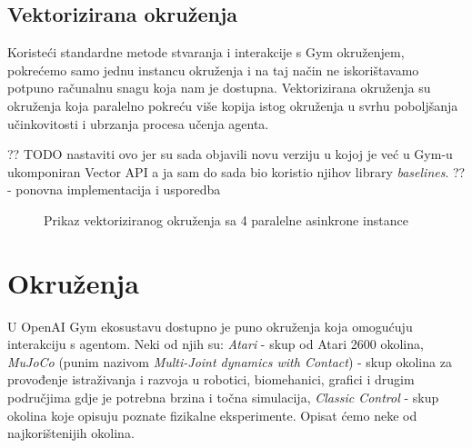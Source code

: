 \subsection{Vektorizirana okruženja}

Koristeći standardne metode stvaranja i interakcije s Gym okruženjem, pokrećemo samo jednu instancu okruženja i na taj način ne iskorištavamo potpuno računalnu snagu koja nam je dostupna. Vektorizirana okruženja  su okruženja koja paralelno pokreću više kopija istog okruženja u svrhu poboljšanja učinkovitosti i ubrzanja procesa učenja agenta.

?? TODO nastaviti ovo jer su sada objavili novu verziju u kojoj je već u Gym-u ukomponiran Vector API a ja sam do sada bio koristio njihov library \textit{baselines}. ?? - ponovna implementacija i usporedba

\begin{figure}[H]
    \centering
    \caption{Prikaz vektoriziranog okruženja sa 4 paralelne asinkrone instance}
    \label{fig:breakout-vect}
\end{figure}

\section{Okruženja}

U OpenAI Gym ekosustavu dostupno je puno okruženja koja omogućuju interakciju s agentom. Neki od njih su: \textit{Atari} - skup od Atari 2600 okolina, \textit{MuJoCo} (punim nazivom \textit{Multi-Joint dynamics with Contact}) - skup okolina za provođenje istraživanja i razvoja u robotici, biomehanici, grafici i drugim područjima gdje je potrebna brzina i točna simulacija, \textit{Classic Control} - skup okolina koje opisuju poznate fizikalne eksperimente. Opisat ćemo neke od najkorištenijih okolina.


